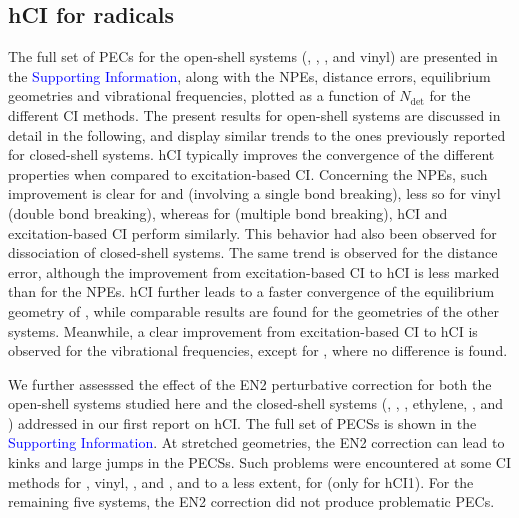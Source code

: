 \documentclass[aip,jcp,reprint,noshowkeys,superscriptaddress]{revtex4-1}
\newcommand{\SupInf}{\textcolor{blue}{Supporting Information}}
\newcommand{\Ndet}{N_\text{det}}
\begin{document}
\subsection{hCI for radicals}
\label{sec:res_A}


The full set of PECs for the open-shell systems (, , , and vinyl) are presented in the {\SupInf},
along with the NPEs, distance errors, equilibrium geometries and vibrational frequencies, plotted as a function of $\Ndet$ for the different CI methods.
The present results for open-shell systems are discussed in detail in the following,
and display similar trends to the ones previously reported for closed-shell systems. \cite{Kossoski_2022}
hCI typically improves the convergence of the different properties when compared to excitation-based CI.
Concerning the NPEs, such improvement is clear for  and  (involving a single bond breaking), less so for vinyl (double bond breaking),
whereas for  (multiple bond breaking), hCI and excitation-based CI perform similarly.
This behavior had also been observed for dissociation of closed-shell systems. \cite{Kossoski_2022}
The same trend is observed for the distance error, although the improvement from excitation-based CI to hCI is less marked than for the NPEs.
hCI further leads to a faster convergence of the equilibrium geometry of , while comparable results are found for the geometries of the other systems.
Meanwhile, a clear improvement from excitation-based CI to hCI is observed for the vibrational frequencies, except for , where no difference is found.



We further assesssed the effect of the EN2 perturbative correction for both the open-shell systems studied here 
and the closed-shell systems (, , , ethylene, , and ) addressed in our first report on hCI. \cite{Kossoski_2022}
The full set of PECSs is shown in the {\SupInf}.
At stretched geometries, the EN2 correction can lead to kinks and large jumps in the PECSs.
Such problems were encountered at some CI methods for , vinyl, , and , and to a less extent, for  (only for hCI1).
For the remaining five systems, the EN2 correction did not produce problematic PECs.
\end{document}
